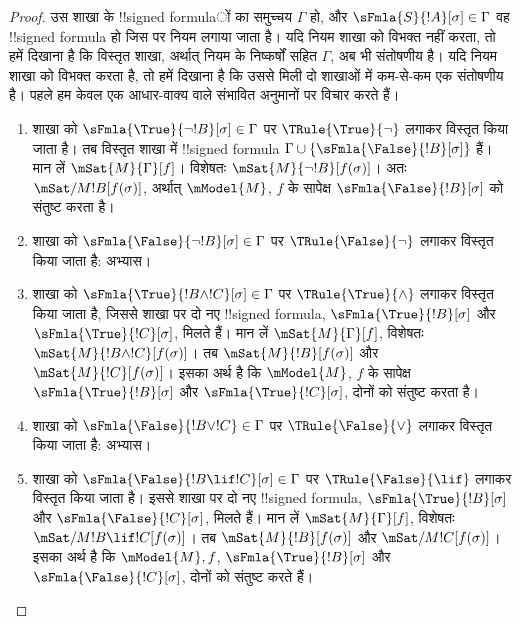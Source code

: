 \documentclass[../../../include/open-logic-section]{subfiles}
\begin{document}
\begin{proof}
उस शाखा के !!{signed formula}ों का समुच्चय $\Gamma$ हो, और
$\sFmla{S}{!A}[\sigma] \in \Gamma$ वह !!{signed formula} हो जिस पर नियम
लगाया जाता है। यदि नियम शाखा को विभक्त नहीं करता, तो हमें दिखाना है कि
विस्तृत शाखा, अर्थात् नियम के निष्कर्षों सहित $\Gamma$, अब भी संतोषणीय
है। यदि नियम शाखा को विभक्त करता है, तो हमें दिखाना है कि उससे मिली दो
शाखाओं में कम-से-कम एक संतोषणीय है।
पहले हम केवल एक आधार-वाक्य वाले संभावित अनुमानों पर विचार करते हैं।
\begin{enumerate}
\item शाखा को $\sFmla{\True}{\lnot !B}[\sigma] \in \Gamma$ पर
  $\TRule{\True}{\lnot}$ लगाकर विस्तृत किया जाता है। तब विस्तृत शाखा में
  !!{signed formula} $\Gamma \cup \{\sFmla{\False}{!B}[\sigma]\}$ हैं।
  मान लें $\mSat{M}{\Gamma}[f]$। विशेषतः
  $\mSat{M}{\lnot !B}[f(\sigma)]$। अतः
  $\mSat/{M}{!B}[f(\sigma)]$, अर्थात् $\mModel{M}$, $f$ के सापेक्ष
  $\sFmla{\False}{!B}[\sigma]$ को संतुष्ट करता है।
\item शाखा को $\sFmla{\False}{\lnot !B}[\sigma] \in \Gamma$ पर
  $\TRule{\False}{\lnot}$ लगाकर विस्तृत किया जाता है: अभ्यास।
\item शाखा को $\sFmla{\True}{!B \land !C}[\sigma] \in \Gamma$ पर
  $\TRule{\True}{\land}$ लगाकर विस्तृत किया जाता है, जिससे शाखा पर दो नए
  !!{signed formula}, $\sFmla{\True}{!B}[\sigma]$ और
  $\sFmla{\True}{!C}[\sigma]$, मिलते हैं। मान लें
  $\mSat{M}{\Gamma}[f]$, विशेषतः $\mSat{M}{!B \land !C}[f(\sigma)]$।
  तब $\mSat{M}{!B}[f(\sigma)]$ और $\mSat{M}{!C}[f(\sigma)]$। इसका अर्थ
  है कि $\mModel{M}$, $f$ के सापेक्ष $\sFmla{\True}{!B}[\sigma]$ और
  $\sFmla{\True}{!C}[\sigma]$, दोनों को संतुष्ट करता है।
\item शाखा को $\sFmla{\False}{!B \lor !C} \in \Gamma$ पर
  $\TRule{\False}{\lor}$ लगाकर विस्तृत किया जाता है: अभ्यास।
\item शाखा को $\sFmla{\False}{!B \lif !C}[\sigma] \in \Gamma$ पर
  $\TRule{\False}{\lif}$ लगाकर विस्तृत किया जाता है। इससे शाखा पर दो नए
  !!{signed formula}, $\sFmla{\True}{!B}[\sigma]$ और
  $\sFmla{\False}{!C}[\sigma]$, मिलते हैं। मान लें
  $\mSat{M}{\Gamma}[f]$, विशेषतः
  $\mSat/{M}{!B \lif !C}[f(\sigma)]$। तब
  $\mSat{M}{!B}[f(\sigma)]$ और $\mSat/{M}{!C}[f(\sigma)]$। इसका अर्थ
  है कि $\mModel{M}, f$, $\sFmla{\True}{!B}[\sigma]$ और
  $\sFmla{\False}{!C}[\sigma]$, दोनों को संतुष्ट करते हैं।

\end{enumerate}
\end{proof}
\end{document}
